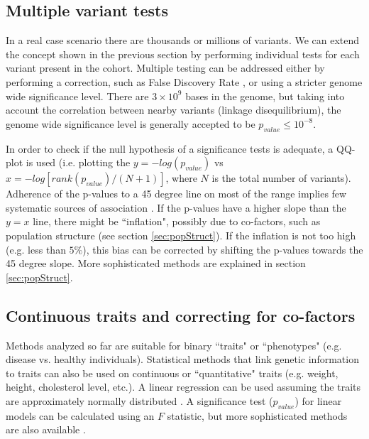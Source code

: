 \subsection{Multiple variant tests}

In a real case scenario there are thousands or millions of variants. We can extend the concept shown in the previous section by performing individual tests for each variant present in the cohort. Multiple testing can be addressed either by performing a correction, such as False Discovery Rate \cite{balding2006tutorial, clarke2011basic}, or using a stricter genome wide significance level. There are $3 \times 10^9$ bases in the genome, but taking into account the correlation between nearby variants (linkage disequilibrium), the genome wide significance level is generally accepted to be $p_{value} \leq 10^{-8}$.

In order to check if the null hypothesis of a significance tests is adequate, a QQ-plot is used (i.e. plotting the $y = -log(p_{value})$ vs $x = -log[ rank(p_{value}) / (N+1) ]$, where $N$ is the total number of variants). Adherence of the p-values to a 45 degree line on most of the range implies few systematic sources of association \cite{balding2006tutorial, clarke2011basic}. If the p-values have a higher slope than the $y=x$ line, there might be ``inflation", possibly due to co-factors, such as population structure (see section \ref{sec:popStruct}). If the inflation is not too high (e.g. less than $5\%$), this bias can be corrected by shifting the p-values towards the 45 degree slope. More sophisticated methods are explained in section \ref{sec:popStruct}.

\subsection{Continuous traits and correcting for co-factors \label{sec:cofactors}}

Methods analyzed so far are suitable for binary ``traits" or ``phenotypes" (e.g. disease vs. healthy individuals). Statistical methods that link genetic information to traits can also be used on continuous or ``quantitative" traits (e.g. weight, height, cholesterol level, etc.). A linear regression can be used assuming the traits are approximately normally distributed \cite{balding2006tutorial, clarke2011basic}. A significance test ($p_{value}$) for linear models can be calculated using an $F$ statistic, but more sophisticated methods are also available \cite{balding2006tutorial, clarke2011basic}.


